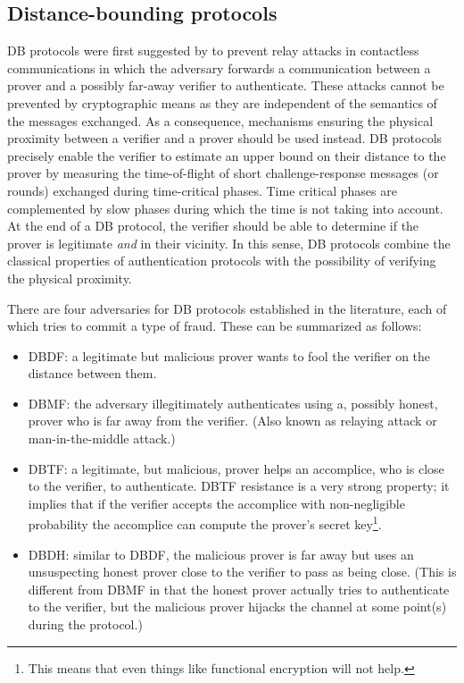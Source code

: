 \subsection{Distance-bounding protocols}%
\label{distance-bounding}

\Ac{DB} protocols were first suggested by \citet{DistanceBounding} to prevent relay attacks in contactless communications in which the adversary forwards a communication between a prover and a possibly far-away verifier to authenticate. 
These attacks cannot be prevented by cryptographic means as they are independent of the semantics of the messages exchanged.
As a consequence, mechanisms ensuring the physical proximity between a verifier and a prover should be used instead.
\Ac{DB} protocols precisely enable the verifier to estimate an upper bound on their distance to the prover by measuring the time-of-flight of short challenge-response messages (or rounds) exchanged during time-critical phases. 
Time critical phases are complemented by slow phases during which the time is not taking into account. 
At the end of a \Ac{DB} protocol, the verifier should be able to
determine if the prover is legitimate \emph{and} in their vicinity.
In this sense, \Ac{DB} protocols combine the classical properties of authentication protocols with the possibility of verifying the physical proximity.

There are four adversaries for \ac{DB} protocols established in the literature, 
each of which tries to commit a type of fraud.
These can be summarized as follows:
\begin{itemize}
  \item \Acf{DBDF}: a legitimate but malicious prover wants to fool the verifier on the distance between them.
  \item \Acf{DBMF}: the adversary illegitimately authenticates using a, 
    possibly honest, prover who is far away from the verifier.
    (Also known as relaying attack or man-in-the-middle attack.)
  \item \Acf{DBTF}: a legitimate, but malicious, prover helps an accomplice, 
    who is close to the verifier, to authenticate.
    \Ac{DBTF} resistance is a very strong property; it implies that if the 
    verifier accepts the accomplice with non-negligible probability the 
    accomplice can compute the prover's secret key\footnote{%
      This means that even things like functional encryption will not help.
    }.
  \item \Acf{DBDH}: similar to \ac{DBDF}, the malicious prover is far away but 
    uses an unsuspecting honest prover close to the verifier to pass as being 
    close.
    (This is different from \ac{DBMF} in that the honest prover actually tries 
    to authenticate to the verifier, but the malicious prover hijacks the 
    channel at some point(s) during the protocol.)
\end{itemize}

